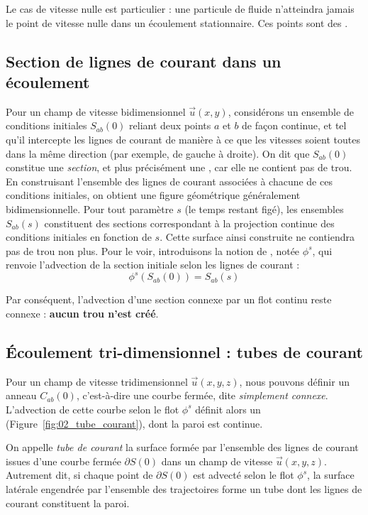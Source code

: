 Le cas de vitesse nulle est particulier : une particule de fluide n'atteindra jamais le point de vitesse nulle dans un écoulement stationnaire. Ces points sont des .

\subsection{Section de lignes de courant dans un écoulement}
Pour un champ de vitesse bidimensionnel $\vec{u}(x,y)$, considérons un ensemble de conditions initiales ${S}_{ab}(0)$ reliant deux points $a$ et $b$ de façon continue, et tel qu’il intercepte les lignes de courant de manière à ce que les vitesses soient toutes dans la même direction (par exemple, de gauche à droite).
On dit que ${S}_{ab}(0)$ constitue une \emph{section}, et plus précisément une , car elle ne contient pas de trou.
En construisant l’ensemble des lignes de courant associées à chacune de ces conditions initiales, on obtient une figure géométrique généralement bidimensionnelle. Pour tout paramètre $s$ (le temps restant figé), les ensembles ${S}_{ab}(s)$ constituent des sections correspondant à la projection continue des conditions initiales en fonction de $s$. Cette surface ainsi construite ne contiendra pas de trou non plus.
Pour le voir, introduisons la notion de , notée $\phi^s$, qui renvoie l’advection de la section initiale selon les lignes de courant :
\begin{equation}
  \phi^s({S}_{ab}(0)) = {S}_{ab}(s)
  \label{eq:flot_2d}
\end{equation}

Par conséquent, l’advection d’une section connexe par un flot continu reste connexe : \textbf{aucun trou n’est créé}.

\subsection{Écoulement tri-dimensionnel : tubes de courant}
Pour un champ de vitesse tridimensionnel $\vec{u}(x,y,z)$, nous pouvons définir un anneau ${C}_{ab}(0)$, c’est-à-dire une courbe fermée, dite \emph{simplement connexe}. L’advection de cette courbe selon le flot $\phi^s$ définit alors un  (Figure~\ref{fig:02_tube_courant}), dont la paroi est continue.

On appelle \emph{tube de courant} la surface formée par l’ensemble des lignes de courant issues d’une courbe fermée ${\partial S}(0)$ dans un champ de vitesse $\vec{u}(x,y,z)$. Autrement dit, si chaque point de $\partial S(0)$ est advecté selon le flot $\phi^s$, la surface latérale engendrée par l’ensemble des trajectoires forme un tube dont les lignes de courant constituent la paroi.

